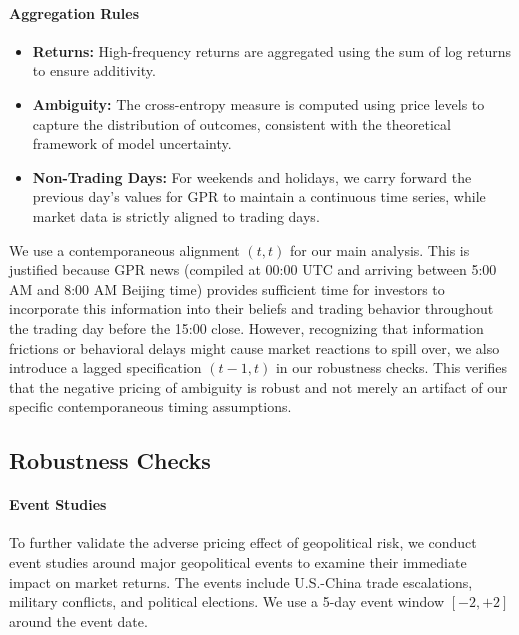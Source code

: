 \documentclass[preprint,12pt,authoryear]{elsarticle}
\begin{document}
\paragraph{Aggregation Rules}
\begin{itemize}
    \item \textbf{Returns:} High-frequency returns are aggregated using the sum of log returns to ensure additivity.
    \item \textbf{Ambiguity:} The cross-entropy measure is computed using price levels to capture the distribution of outcomes, consistent with the theoretical framework of model uncertainty.
    \item \textbf{Non-Trading Days:} For weekends and holidays, we carry forward the previous day's values for GPR to maintain a continuous time series, while market data is strictly aligned to trading days.
\end{itemize}

We use a contemporaneous alignment $(t, t)$ for our main analysis. This is justified because GPR news (compiled at 00:00 UTC and arriving between 5:00 AM and 8:00 AM Beijing time) provides sufficient time for investors to incorporate this information into their beliefs and trading behavior throughout the trading day before the 15:00 close. However, recognizing that information frictions or behavioral delays might cause market reactions to spill over, we also introduce a lagged specification $(t-1, t)$ in our robustness checks. This verifies that the negative pricing of ambiguity is robust and not merely an artifact of our specific contemporaneous timing assumptions.

\subsection{Robustness Checks}

\paragraph{Event Studies} To further validate the adverse pricing effect of geopolitical risk, we conduct event studies around major geopolitical events to examine their immediate impact on market returns. The events include U.S.-China trade escalations, military conflicts, and political elections. We use a 5-day event window $[-2, +2]$ around the event date.
\end{document}
